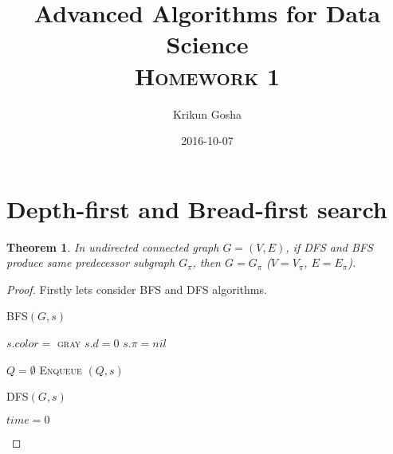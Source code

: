 \documentclass{article}
\title{Advanced Algorithms for Data Science \\ \textsc{Homework 1}}
\author{Krikun Gosha}
\date{2016-10-07}
\let\oldnl\nl
\newcommand{\nonl}{\renewcommand{\nl}{\let\nl\oldnl}}
\newtheorem{theorem}{Theorem}[section]
\begin{document}
\maketitle

\section{Depth-first and Bread-first search}

\begin{theorem}
  In undirected connected graph $G=(V, E)$,
  if DFS and BFS produce same predecessor subgraph $G_\pi$,
  then $G=G_\pi$ ($V=V_\pi$, $E=E_\pi$).
\end{theorem}


\begin{proof}
  Firstly lets consider BFS \cite[page 595]{introtoalg} and DFS \cite[page 604]{introtoalg} algorithms.

\begin{multicols}{2}

\IncMargin{1em}
\begin{algorithm}[H]
  \SetAlgoNoEnd\SetAlgoNoLine
  \SetNlSkip{1.5em}
  \DontPrintSemicolon

  \nonl \textsc{BFS}$(G,s)$


  $s.color = $ \textsc{gray}\;
  $s.d = 0$\;
  $s.\pi = nil$\;

  $Q = \emptyset$\;
  \textsc{Enqueue} $(Q,s)$\;
\end{algorithm}

\columnbreak

\begin{algorithm}[H]
  \SetAlgoNoEnd\SetAlgoNoLine
  \SetNlSkip{1.5em}
  \DontPrintSemicolon

  \nonl \textsc{DFS}$(G,s)$

  $time = 0$\;
\end{algorithm}


\end{multicols}
\end{proof}
\end{document}
